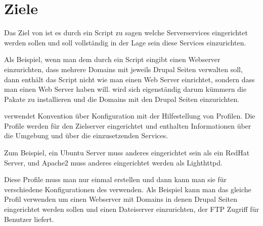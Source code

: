 \section{Ziele}

Das Ziel von \sscontrol{} ist es durch ein Script zu sagen welche Serverservices
eingerichtet werden sollen und \sscontrol{} soll vollständig in der Lage sein
diese Services einzurichten.

Als Beispiel, wenn man dem \sscontrol{} durch ein Script eingibt einen Webserver
einzurichten, dass mehrere Domains mit jeweils Drupal Seiten verwalten
soll, dann enthält das Script nicht wie man einen Web Server einrichtet,
sondern dass man einen Web Server haben will. \sscontrol{} wird sich
eigenständig darum kümmern die Pakate zu installieren und die Domains mit den
Drupal Seiten einzurichten.

\sscontrol{} verwendet Konvention über Konfiguration mit der Hilfestellung von
Profilen. Die Profile werden für den Zielserver eingerichtet und enthalten
Informationen über die Umgebung und über die einzusetzenden Services.

Zum Beispiel, ein Ubuntu Server muss anderes eingerichtet sein als ein RedHat
Server, und Apache2 muss anderes eingerichtet werden als Lighthttpd.

Diese Profile muss man nur einmal erstellen und dann kann man sie für
verschiedene Konfigurationen des \sscontrol{} verwenden. Als Beispiel kann man
das gleiche Profil verwenden um einen Webserver mit Domains in denen Drupal
Seiten eingerichtet werden sollen und einen Dateiserver einzurichten, der FTP
Zugriff für Benutzer liefert.


